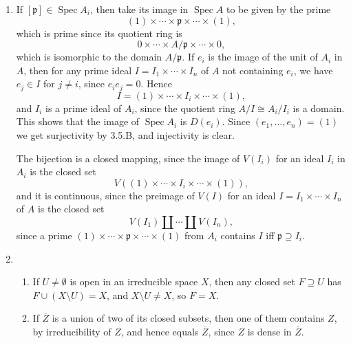 \documentclass{report}
\newcommand{\closure}[1]{\overline{#1}} %
\newcommand{\p}{\mathfrak{p}}
\DeclareMathOperator{\Spec}{Spec}
\begin{document}
\begin{enumerate}[label=\textbf{3.6.\Alph*.}]
	\item If $[\p]\in\Spec A_i$, then take its image in $\Spec A$ to be given by
	      the prime
	      \begin{equation*}
		      (1)\times\cdots\times\p\times\cdots\times(1),
	      \end{equation*}
	      which is prime since its quotient ring is
	      \begin{equation*}
		      0\times\cdots\times A/\p \times\cdots\times0,
	      \end{equation*}
	      which is isomorphic to the domain $A/\p$. If $e_i$ is the image of the
	      unit of $A_i$ in $A$, then for any prime ideal
	      $I=I_1\times\cdots\times I_n$ of $A$ not containing $e_i$, we have
	      $e_j\in I$ for $j\ne i$, since $e_ie_j=0$. Hence
	      \begin{equation*}
		      I = (1)\times\cdots\times I_i\times\cdots\times(1),
	      \end{equation*}
	      and $I_i$ is a prime ideal of $A_i$, since the quotient ring
	      $A/I\cong A_i/I_i$ is a domain. This shows that the image of $\Spec A_i$
	      is $D(e_i)$. Since $(e_1,\ldots,e_n)=(1)$ we get surjectivity by 3.5.B,
	      and injectivity is clear.

	      The bijection is a closed mapping, since the image of $V(I_i)$ for an
	      ideal $I_i$ in $A_i$ is the closed set
	      \begin{equation*}
		      V((1)\times\cdots\times I_i\times\cdots\times(1)),
	      \end{equation*}
	      and it is continuous, since the preimage of $V(I)$ for an ideal
	      $I=I_1\times\cdots\times I_n$ of $A$ is the closed set
	      \begin{equation*}
		      V(I_1) \amalg \cdots \amalg V(I_n),
	      \end{equation*}
	      since a prime $(1)\times\cdots\times\p\times\cdots\times(1)$ from $A_i$
	      contains $I$ iff $\p\supseteq I_i$.

	\item
	      \begin{enumerate}[label=(\alph*)]
		      \item If $U\ne\emptyset$ is open in an irreducible space $X$, then
		            any closed set $F\supseteq U$ has $F\cup(X\setminus U)=X$, and
		            $X\setminus U\ne X$, so $F=X$.

		      \item If $\closure Z$ is a union of two of its closed subsets, then
		            one of them contains $Z$, by irreducibility of $Z$, and hence
		            equals $\closure Z$, since $Z$ is dense in $\closure Z$.
	      \end{enumerate}


\end{enumerate}
\end{document}
